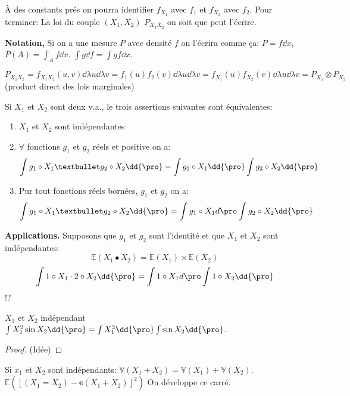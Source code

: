 	\begin{remark}
		À des constants prés on pourra identifier $f_{X_1}$ avec $f_1$ et $f_{X_2}$ avec $f_2$. Pour terminer: La loi du couple $(X_1, X_2)$ $P_{X_1X_2}$ on soit que peut l'écrire. 
		
		\textbf{Notation,} Si on a une mesure $P$ avec densité $f$ on l'écrira comme ça: $P=f\dd{x}$, $P(A)=\int_A f\dd{x}$. $\int g\dd{f}=\int g f\dd{x}$.
	\end{remark}
	
		$$P_{X_1X_2}=f_{X_1X_2}(u, v)\dd{\lambda u}\dd{\lambda v}=f_1(u)f_2(v)\dd{\lambda u}\dd{\lambda v}=f_{X_1}(u)f_{X_2}(v)\dd{\lambda u}\dd{\lambda v}=P_{X_1}\otimes P_{X_2}$$ (product direct des lois marginales)

\begin{proposition}
	Si $X_1$ et $X_2$ sont deux v.a., le trois assertions suivantes sont équivalentes:
	\begin{enumerate}
		\item $X_1$ et $X_2$ sont indépendantes
		\item $\forall$ fonctions $g_1$ et $g_2$ réels et positive on a:
			$$\int g_1\circ X_1 • g_2\circ X_2\dd{\pro}= \int g_1\circ X_1 \dd{\pro}\int g_2\circ X_2\dd{\pro}$$
		\item Pur tout fonctions réels bornées, $g_1$ et $g_2$ on a:
			$$\int g_1\circ X_1 • g_2\circ X_2\dd{\pro}= \int g_1\circ X_1 d{\pro}\int g_2\circ X_2\dd{\pro}$$
	\end{enumerate}
\end{proposition}

\textbf{Applications.} Supposons que $g_1$ et $g_2$ sont l'identité et que $X_1$ et $X_2$ sont indépendantes:
	$$\mathbb{E}(X_1• X_2)=\mathbb{E}(X_1)\times\mathbb{E}(X_2)$$
	$$\int 1\circ X_1 \cdot 2\circ X_2\dd{\pro}= \int 1\circ X_1 d{\pro}\int 1\circ X_2\dd{\pro}$$!?
	
\begin{examplebox}
	$X_1$ et $X_2$ indépendant\\$\int X_1^2 \sin X_2\dd{\pro}=\int X_1^2 \dd{\pro} \int \sin X_2\dd{\pro}$.
\end{examplebox}

\begin{proof}
	(Idée) %
\end{proof}

\begin{remark}
	Si $x_1$ et $X_2$ sont indépendants: $\mathbb{V}(X_1+X_2)=\mathbb{V}(X_1)+\mathbb{V}(X_2)$.
	$\mathbb{E}([(X_1=X_2)-\mathbb{e}(X_1+X_2)]^2)$ On développe ce carré.	
\end{remark}

